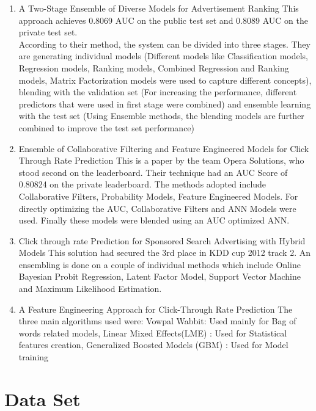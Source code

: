 \documentclass[10pt]{article}
\begin{document}
\begin{enumerate}
	\item A Two-Stage Ensemble of Diverse Models for Advertisement Ranking
This approach achieves 0.8069 AUC on the public test set and 0.8089 AUC on the private test set.\\
According to their method, the system can be divided into three stages. They are generating individual models (Different models like Classification models, Regression models, Ranking models, Combined Regression and Ranking models, Matrix Factorization models were used to capture different concepts), blending with the validation set (For increasing the performance, different predictors that were used in first stage were combined) and ensemble learning with the test set (Using Ensemble methods, the blending models are further combined to improve the test set performance)
	\item Ensemble of Collaborative Filtering and Feature Engineered Models for Click Through Rate Prediction
This is a paper by the team Opera Solutions, who stood second on the leaderboard. Their technique had an AUC Score of 0.80824 on the private leaderboard. The methods adopted include Collaborative Filters, Probability Models, Feature Engineered Models. For directly optimizing the AUC, Collaborative Filters and ANN Models were used. Finally these models were blended using an AUC optimized ANN.\\
	\item Click through rate Prediction for Sponsored Search Advertising with Hybrid Models
This solution had secured the 3rd place in KDD cup 2012 track 2. An ensembling is done on a couple of individual methods which include Online Bayesian Probit Regression, Latent Factor Model, Support Vector Machine and Maximum Likelihood Estimation. \\	
	\item A Feature Engineering Approach for Click-Through Rate Prediction
The three main algorithms used were:
Vowpal Wabbit:  Used mainly for Bag of words related models, Linear Mixed Effects(LME) : Used for Statistical features creation, Generalized Boosted Models (GBM) : Used for Model training\\
 
\end{enumerate}
\section{\label{reflabel} Data Set}
\end{document}
